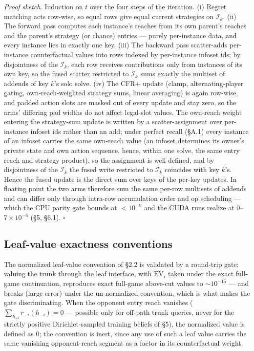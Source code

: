 \documentclass[11pt]{article}
\begin{document}
\emph{Proof sketch.} Induction on $t$ over the four steps of the iteration. (i) Regret
matching acts row-wise, so equal rows give equal current strategies on $\mathcal{I}_k$.
(ii) The forward pass computes each instance's reaches from its own parent's reaches and
the parent's strategy (or chance) entries --- purely per-instance data, and every
instance lies in exactly one key. (iii) The backward pass scatter-adds per-instance
counterfactual values into rows indexed by per-instance infoset ids; by disjointness of
the $\mathcal{I}_k$, each row receives contributions only from instances of its own key,
so the fused scatter restricted to $\mathcal{I}_k$ sums exactly the multiset of addends
of key $k$'s solo solve. (iv) The CFR+ update (clamp, alternating-player gating,
own-reach-weighted strategy sums, linear averaging) is again row-wise, and padded action
slots are masked out of every update and stay zero, so the arms' differing pad widths do
not affect legal-slot values. The own-reach weight entering the strategy-sum update is
written by a scatter-assignment over per-instance infoset ids rather than an add; under
perfect recall (\S A.1) every instance of an infoset carries the same own-reach value
(an infoset determines its owner's private state and own action sequence, hence, within
one solve, the same entry reach and strategy product), so the assignment is
well-defined, and by disjointness of the $\mathcal{I}_k$ the fused write restricted to
$\mathcal{I}_k$ coincides with key $k$'s. Hence the fused update is the direct sum over
keys of the per-key updates. In floating point the two arms therefore sum the same
per-row multisets of addends and can differ only through intra-row accumulation order
and op scheduling --- which the CPU parity gate bounds at $<10^{-9}$ and the CUDA runs
realize at $0$--$7\times10^{-6}$ (\S5, \S6.1). $\square$

\subsection{Leaf-value exactness conventions}

The normalized leaf-value convention of \S2.2 is validated by a round-trip gate: valuing
the trunk through the leaf interface, with $\mathrm{EV}_i$ taken under the exact
full-game continuation, reproduces exact full-game above-cut values to $\sim 10^{-15}$
--- and breaks (large error) under the un-normalized convention, which is what makes the
gate discriminating. When the opponent entry reach vanishes ($\sum_{h_{-i}}
r_{-i}(h_{-i}) = 0$ --- possible only for off-path trunk queries, never for the strictly
positive Dirichlet-sampled training beliefs of \S5), the normalized value is defined as
$0$; the convention is inert, since any use of such a leaf value carries the same
vanishing opponent-reach segment as a factor in its counterfactual weight.
\end{document}
